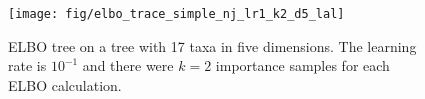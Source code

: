 \documentclass[11pt, twocolumn]{article}
\begin{document}

\begin{figure}[htbp] \label{fig:elbo_trace}
\begin{center}
    \texttt{[image: fig/elbo\_trace\_simple\_nj\_lr1\_k2\_d5\_lal]}
\end{center}
\caption{ELBO tree on a tree with 17 taxa in five dimensions. The learning rate is $10^{-1}$ and there were $k=2$ importance samples for each ELBO calculation.}
\end{figure}

%
%
%
	
\end{document}
